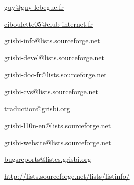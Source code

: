 \urldef{\urlGuyLebegueEmail}%
\url{guy@guy-lebegue.fr}     %

\urldef{\urlMicheleBondilEmail}%
\url{ciboulette05@club-internet.fr}     %

\urldef{\urlListInfoEmail}%
\url{grisbi-info@lists.sourceforge.net}     %

\urldef{\urlListDevelEmail}%
\url{grisbi-devel@lists.sourceforge.net}     %

\urldef{\urlListDocEmail}%
\url{grisbi-doc-fr@lists.sourceforge.net}     %

\urldef{\urlListCVSEmail}%
\url{grisbi-cvs@lists.sourceforge.net}     %

\urldef{\urlListTraductionEmail}%
\url{traduction@grisbi.org}  %

\urldef{\urlListAnglaiseEmail}%
\url{grisbi-l10n-en@lists.sourceforge.net}     %

\urldef{\urlListWebmestre}%
\url{grisbi-website@lists.sourceforge.net}     %

\urldef{\urlListBugsreport}%
\url{bugsreports@listes.grisbi.org}     %

\urldef{\urlListSF}%
\url{http://lists.sourceforge.net/lists/listinfo/}     %


